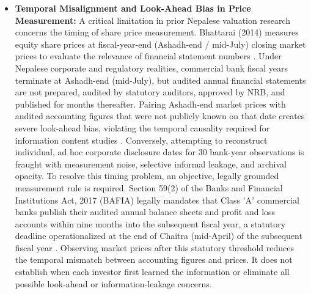 \begin{itemize}
\item \textbf{Temporal Misalignment and Look-Ahead Bias in Price Measurement:}
A critical limitation in prior Nepalese valuation research concerns the timing of share price measurement. Bhattarai (2014) measures equity share prices at fiscal-year-end (Ashadh-end / mid-July) closing market prices to evaluate the relevance of financial statement numbers \citep{bhattarai2014}. Under Nepalese corporate and regulatory realities, commercial bank fiscal years terminate at Ashadh-end (mid-July), but audited annual financial statements are not prepared, audited by statutory auditors, approved by NRB, and published for months thereafter. Pairing Ashadh-end market prices with audited accounting figures that were not publicly known on that date creates severe look-ahead bias, violating the temporal causality required for information content studies \citep{ball1968,beaver1968,bernard1989}. Conversely, attempting to reconstruct individual, ad hoc corporate disclosure dates for 30 bank-year observations is fraught with measurement noise, selective informal leakage, and archival opacity. To resolve this timing problem, an objective, legally grounded measurement rule is required. Section 59(2) of the Banks and Financial Institutions Act, 2017 (BAFIA) legally mandates that Class 'A' commercial banks publish their audited annual balance sheets and profit and loss accounts within nine months into the subsequent fiscal year, a statutory deadline operationalized at the end of Chaitra (mid-April) of the subsequent fiscal year \citep{bafia2017}. Observing market prices after this statutory threshold reduces the temporal mismatch between accounting figures and prices. It does not establish when each investor first learned the information or eliminate all possible look-ahead or information-leakage concerns.


\end{itemize}
